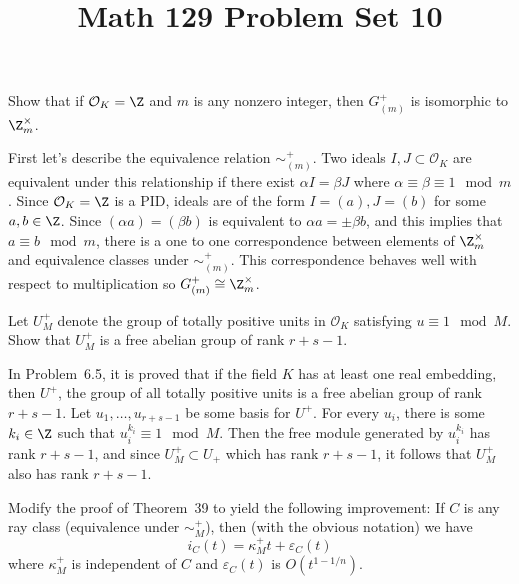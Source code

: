 \documentclass[11pt,letterpaper]{article}
\title{\textbf{Math 129 Problem Set 10}}
\begin{document}
\maketitle

\begin{cproblem}{6.11}
    Show that if $\mathcal{O}_K=\Z$ and $m$ is any nonzero integer, then $G^+_{(m)}$ is isomorphic to $\Z_m^\times$.
\end{cproblem}

\begin{solution}
    First let's describe the equivalence relation $\sim^+_{(m)}$. Two ideals $I,J\subset \mathcal{O}_K$ are equivalent under this relationship if there exist $\alpha I=\beta J$ where $\alpha\equiv \beta\equiv 1\mod m$. Since $\mathcal{O}_K = \Z$ is a PID, ideals are of the form $I=(a), J=(b)$ for some $a,b\in \Z$. Since $(\alpha a) = (\beta b)$ is equivalent to $\alpha a = \pm\beta b$, and this implies that $a\equiv b\mod m$, there is a one to one correspondence between elements of $\Z_m^\times$ and equivalence classes under $\sim^+_{(m)}$. This correspondence behaves well with respect to multiplication so $G_{(m)}^+\cong \Z^\times_m$.
\end{solution}

\begin{cproblem}{6.12}
    Let $U_M^+$ denote the group of totally positive units in $\mathcal{O}_K$ satisfying $u\equiv 1\mod M$. Show that $U^+_M$ is a free abelian group of rank $r+s-1$. %
\end{cproblem}

\begin{solution}
    In Problem~6.5, it is proved that if the field $K$ has at least one real embedding, then $U^+$, the group of all totally positive units is a free abelian group of rank $r+s-1$. Let $u_1,\ldots,u_{r+s-1}$ be some basis for $U^+$. For every $u_i$, there is some $k_i\in \Z$ such that $u_i^{k_i}\equiv 1\mod M$. Then the free module generated by $u_i^{k_i}$ has rank $r+s-1$, and since $U_M^+\subset U_+$ which has rank $r+s-1$, it follows that $U_M^+$ also has rank $r+s-1$.
\end{solution}

\begin{cproblem}{6.13}
    Modify the proof of Theorem~39 to yield the following improvement: If $C$ is any ray class (equivalence under $\sim^+_M $), then (with the obvious notation) we have
    \[
        i_C(t) = \kappa^+_M t + \varepsilon_C(t)
    \]
    where $\kappa^+_M$ is independent of $C$ and $\varepsilon_C(t)$ is $O(t^{1-1/n})$.
\end{cproblem}
\end{document}
